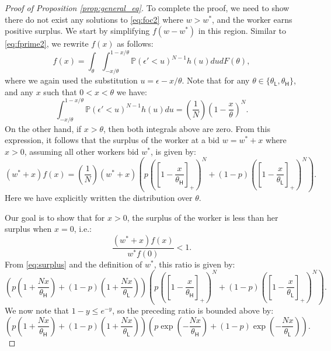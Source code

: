 \documentclass[11pt]{article}
\renewcommand{\H}{\ensuremath{\mathsf{H}}}
\renewcommand{\L}{\ensuremath{\mathsf{L}}}
\renewcommand{\P}{\ensuremath{\mathbb{P}}}
\begin{document}
\begin{proof}[Proof of Proposition \ref{prop:general_eq}]
To complete the proof, we need to show there do not exist any solutions to \eqref{eq:foc2} where $w > w^*$, and the worker earns positive surplus.
We start by simplifying $f(w - w^*)$ in this region.
Similar to \eqref{eq:fprime2}, we rewrite $f(x)$ as follows:
\begin{equation}
\label{eq:f2}
f(x) = \int_\theta \int_{-x/\theta}^{1-x/\theta} \P\left(\epsilon' < u\right)^{N-1} h(u) du dF(\theta),
\end{equation}
where we again used the substitution $u = \epsilon - x/\theta$.
Note that for any $\theta \in \{ \theta_{\L}, \theta_{\H} \}$, and any $x$ such that $0 < x < \theta$  we have:
\[ \int_{-x/\theta}^{1-x/\theta} \P\left(\epsilon' < u\right)^{N-1} h(u) du  = \left( \frac{1}{N} \right) \left( 1 - \frac{x}{\theta} \right)^{N}. \]
On the other hand, if $x > \theta$, then both integrals above are zero.
From this expression, it follows that the surplus of the worker at a bid $w = w^* + x$ where $x > 0$, assuming all other workers bid $w^*$, is given by:
\begin{equation}
\label{eq:surplus}
 (w^* + x) f(x) = \left( \frac{1}{N} \right) \left( w^* + x \right) \left( p \left( \left[1 - \frac{x}{\theta_{\H}} \right]_+ \right)^{N} + (1-p) \left( \left[1 - \frac{x}{\theta_{\L}} \right]_+ \right)^{N} \right).
\end{equation}
Here we have explicitly written the distribution over $\theta$.

Our goal is to show that for $x > 0$, the surplus of the worker is less than her surplus when $x = 0$, i.e.:
\begin{equation}
\label{eq:ratio}
 \frac{(w^* + x) f(x)}{w^* f(0)} < 1.
\end{equation}
From \eqref{eq:surplus} and the definition of $w^*$, this ratio is given by:
\[ \left( p \left( 1 + \frac{Nx}{\theta_{\H}}\right) + (1-p)\left( 1 + \frac{Nx}{\theta_{\L}} \right) \right) \left( p \left( \left[1 - \frac{x}{\theta_{\H}} \right]_+ \right)^{N} + (1-p) \left( \left[1 - \frac{x}{\theta_{\L}} \right]_+ \right)^{N} \right). \]
We now note that $1 - y \leq e^{-y}$, so the preceding ratio is bounded above by:
\begin{equation}
\label{eq:ratio2}
\left( p \left( 1 + \frac{Nx}{\theta_{\H}}\right) + (1-p)\left( 1 + \frac{Nx}{\theta_{\L}} \right) \right) 
\left( p \exp \left( -\frac{Nx}{\theta_{\H}} \right) + (1-p) \exp \left( -\frac{Nx}{\theta_{\L}} \right) \right).
\end{equation}


\end{proof}
\end{document}
